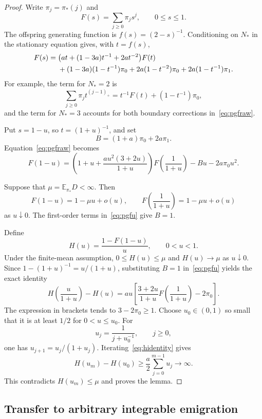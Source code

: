 \documentclass[11pt]{amsart}
\numberwithin{equation}{section}
\theoremstyle{remark}
\newcommand{\E}{\mathbb E}
\begin{document}
\begin{proof}
Write $\pi_j=\pi_*(j)$ and
\[
 F(s)=\sum_{j\ge0}\pi_js^j,\qquad 0\le s\le1.
\]
The offspring generating function is $f(s)=(2-s)^{-1}$. Conditioning on $N_*$ in the stationary equation gives, with $t=f(s)$,
\begin{align}\label{eq:pgfraw}
 F(s)={}&\bigl(at+(1-3a)t^{-1}+2at^{-2}\bigr)F(t)\notag\\
 &+(1-3a)(1-t^{-1})\pi_0
   +2a(1-t^{-2})\pi_0
   +2a(1-t^{-1})\pi_1.
\end{align}
For example, the term for $N_*=2$ is
\[
 \sum_{j\ge0}\pi_jt^{(j-1)_+}
 =t^{-1}F(t)+(1-t^{-1})\pi_0,
\]
and the term for $N_*=3$ accounts for both boundary corrections in~\eqref{eq:pgfraw}.

Put $s=1-u$, so $t=(1+u)^{-1}$, and set
\[
 B=(1+a)\pi_0+2a\pi_1.
\]
Equation~\eqref{eq:pgfraw} becomes
\begin{equation}\label{eq:pgfu}
 F(1-u)=\left(1+u+\frac{au^2(3+2u)}{1+u}\right)
 F\left(\frac1{1+u}\right)-Bu-2a\pi_0u^2.
\end{equation}

Suppose that $\mu=\E_{\pi_*}D<\infty$. Then
\[
 F(1-u)=1-\mu u+o(u),\qquad
 F\left(\frac1{1+u}\right)=1-\mu u+o(u)
\]
as $u\downarrow0$. The first-order terms in~\eqref{eq:pgfu} give $B=1$.

Define
\[
 H(u)=\frac{1-F(1-u)}u,\qquad 0<u<1.
\]
Under the finite-mean assumption, $0\le H(u)\le\mu$ and $H(u)\to\mu$ as $u\downarrow0$. Since $1-(1+u)^{-1}=u/(1+u)$, substituting $B=1$ in~\eqref{eq:pgfu} yields the exact identity
\begin{equation}\label{eq:hidentity}
 H\left(\frac{u}{1+u}\right)-H(u)
 =au\left[\frac{3+2u}{1+u}F\left(\frac1{1+u}\right)-2\pi_0\right].
\end{equation}
The expression in brackets tends to $3-2\pi_0\ge1$. Choose $u_0\in(0,1)$ so small that it is at least $1/2$ for $0<u\le u_0$. For
\[
 u_j=\frac1{j+u_0^{-1}},\qquad j\ge0,
\]
one has $u_{j+1}=u_j/(1+u_j)$. Iterating~\eqref{eq:hidentity} gives
\[
 H(u_m)-H(u_0)\ge\frac a2\sum_{j=0}^{m-1}u_j\longrightarrow\infty.
\]
This contradicts $H(u_m)\le\mu$ and proves the lemma.
\end{proof}

\subsection{Transfer to arbitrary integrable emigration}
\end{document}
